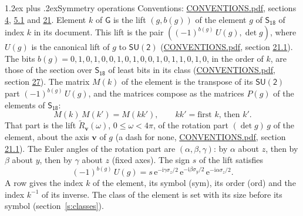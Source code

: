 \documentclass[10pt,a4paper]{article}
\makeatletter
\renewcommand\section{\@startsection{section}{1}{\z@}{-3ex plus -1ex minus -.2ex}%
  {1.2ex plus .2ex}{\normalfont\large\sffamily\bfseries\color{parttitle}}}
\numberwithin{equation}{section}
\newcommand{\grp}[1]{\mathsf{#1}}
\newcommand{\vv}{\mathbf{v}}
\newcommand{\iunit}{\mathrm{i}}
\newcommand{\expe}{\mathrm{e}}
\newcommand{\lift}[1]{\tilde{#1}}
\newcommand{\pauli}[1]{\sigma_{#1}}
\makeatother
\begin{document}
\section{Symmetry operations}\label{s:elements}
Conventions: \href{../../CONVENTIONS.pdf}{CONVENTIONS.pdf}, sections \href{../../../rotation/CONVENTIONS.pdf\#conv.4}{4}, \href{../../../rotation/CONVENTIONS.pdf\#conv.5.1}{5.1} and \href{../../CONVENTIONS.pdf\#conv.21}{21}.
\leavevmode\label{n:index.element}\label{n:element.g}\label{n:function.section}Element $k$ of $\grp{G}$ is the lift $(g, b(g))$ of the element $g$ of \href{../../../rotation/data/pdf/S18.pdf}{$\grp{S_{18}}$} of index $k$ in its document. This lift is the pair $((-1)^{b(g)}\,U(g), \det g)$, where $U(g)$ is the canonical lift of $g$ to $\grp{SU(2)}$ (\href{../../CONVENTIONS.pdf}{CONVENTIONS.pdf}, section \href{../../CONVENTIONS.pdf\#conv.21.1}{21.1}). The bits $b(g) = 0, 1, 0, 1, 0, 0, 1, 0, 1, 0, 0, 1, 0, 1, 1, 0, 1, 0$, in the order of $k$, are those of the section over $\grp{S_{18}}$ of least bits in its class (\href{../../CONVENTIONS.pdf}{CONVENTIONS.pdf}, section \href{../../CONVENTIONS.pdf\#conv.27}{27}). \label{n:matrix.element.pin}\label{n:matrix.element}The matrix $M(k)$ of the element is the transpose of its $\grp{SU(2)}$ part $(-1)^{b(g)}\,U(g)$, and the matrices compose as the matrices $P(g)$ of the elements of $\grp{S_{18}}$:
\begin{equation}\label{e:mprod}M(k)\,M(k') = M(kk'),\qquad kk' = \text{first } k\text{, then } k'.\end{equation}
\leavevmode\label{n:angle.omega}\label{n:vector.axis}\label{n:vector.pole}That part is the lift $\lift{R}_{\vv}(\omega)$, $0 \le \omega < 4\pi$, of the rotation part $(\det g)\,g$ of the element, about the axis $\vv$ of $g$ (a dash for none, \href{../../CONVENTIONS.pdf}{CONVENTIONS.pdf}, section \href{../../CONVENTIONS.pdf\#conv.21.1}{21.1}). \label{n:angle.euler.alpha}\label{n:angle.euler.beta}\label{n:angle.euler.gamma}\label{n:vector.coordinates}The Euler angles of the rotation part are $(\alpha,\beta,\gamma)$: by $\alpha$ about $z$, then by $\beta$ about $y$, then by $\gamma$ about $z$ (fixed axes). \label{n:local.euler.sign}The sign $s$ of the lift satisfies
\begin{equation}\label{e:euler}(-1)^{b(g)}\,U(g) = s\,\expe^{-\iunit\gamma\pauli{z}/2}\,\expe^{-\iunit\beta\pauli{y}/2}\,\expe^{-\iunit\alpha\pauli{z}/2}.\end{equation}
\leavevmode\label{n:index.element.inverse}\label{n:head.sym}\label{n:head.ord}A row gives the index $k$ of the element, its symbol (sym), its order (ord) and the index $k^{-1}$ of its inverse. \label{n:head.class}The class of the element is set with its size before its symbol (section~\ref{s:classes}).
\end{document}
